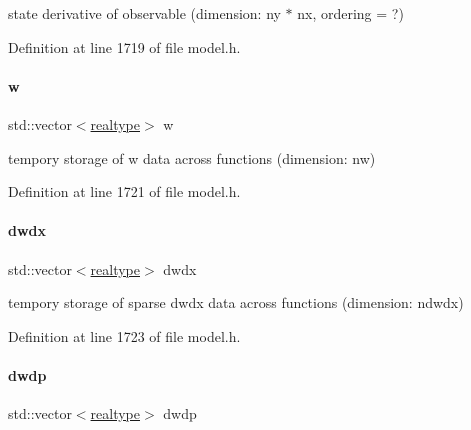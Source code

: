 state derivative of observable (dimension\+: ny $\ast$ nx, ordering = ?) 

Definition at line 1719 of file model.\+h.

\mbox{\label{classamici_1_1_model_a6b305431617db7966c726f756e819843}} 
\paragraph{\texorpdfstring{w}{w}}
{\footnotesize\ttfamily std\+::vector$<$\mbox{\hyperlink{namespaceamici_a1bdce28051d6a53868f7ccbf5f2c14a3}{realtype}}$>$ w\hspace{0.3cm}{\ttfamily [protected]}}

tempory storage of w data across functions (dimension\+: nw) 

Definition at line 1721 of file model.\+h.

\mbox{\label{classamici_1_1_model_a58b93c923b4fd9c0322c969954696210}} 
\paragraph{\texorpdfstring{dwdx}{dwdx}}
{\footnotesize\ttfamily std\+::vector$<$\mbox{\hyperlink{namespaceamici_a1bdce28051d6a53868f7ccbf5f2c14a3}{realtype}}$>$ dwdx\hspace{0.3cm}{\ttfamily [protected]}}

tempory storage of sparse dwdx data across functions (dimension\+: ndwdx) 

Definition at line 1723 of file model.\+h.

\mbox{\label{classamici_1_1_model_ae0be4b469deded11a9b2569a4da9edea}} 
\paragraph{\texorpdfstring{dwdp}{dwdp}}
{\footnotesize\ttfamily std\+::vector$<$\mbox{\hyperlink{namespaceamici_a1bdce28051d6a53868f7ccbf5f2c14a3}{realtype}}$>$ dwdp\hspace{0.3cm}{\ttfamily [protected]}}

